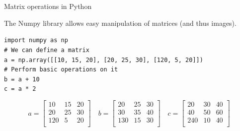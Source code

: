 \documentclass[9pt, aspectratio=169]{beamer}
\begin{document}
\begin{frame}
    {Matrix operations in Python}

    The Numpy library allows easy manipulation of matrices (and thus images).

    \begin{codebox}
        \texttt{import numpy as np\\
            \# We can define a matrix\\
            a = np.array([[10, 15, 20],
                    [20, 25, 30],
                    [120, 5, 20]])\\
            \# Perform basic operations on it\\
            b = a + 10\\
            c = a * 2
        }
    \end{codebox}
    \pause
    $$
        a =
        \begin{bmatrix}
            10  & 15 & 20 \\
            20  & 25 & 30 \\
            120 & 5  & 20 \\
        \end{bmatrix}
        \quad b =
        \begin{bmatrix}
            20  & 25 & 30 \\
            30  & 35 & 40 \\
            130 & 15 & 30 \\
        \end{bmatrix}
        \quad c =
        \begin{bmatrix}
            20  & 30 & 40 \\
            40  & 50 & 60 \\
            240 & 10 & 40 \\
        \end{bmatrix}
    $$
\end{frame}
\end{document}
